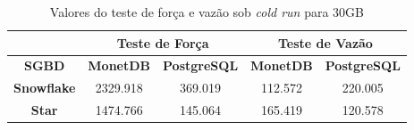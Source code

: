 \begin{table}[htpb]
        \centering
        \caption{Valores do teste de força e vazão sob \textit{cold run} para 30GB}
        \label{tab:forca_vazao_cold_30}
        \begin{tabular}{|c|c|c|c|c|}
        \hline
                                & \multicolumn{2}{c|}{\textbf{Teste de Força}} & \multicolumn{2}{c|}{\textbf{Teste de Vazão}} \\ \hline
        \textbf{SGBD}      & \textbf{MonetDB}    & \textbf{PostgreSQL}    & \textbf{MonetDB}    & \textbf{PostgreSQL}    \\ \hline
        \textbf{Snowflake} & 2329.918            & 369.019                & 112.572             & 220.005                \\ \hline
        \textbf{Star}      & 1474.766            & 145.064                & 165.419             & 120.578                \\ \hline
        \end{tabular}
\end{table}

